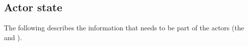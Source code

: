 
 
\subsection{Actor state}

The following describes the information that needs to be part of the \ipc actors (the \gw and \sa).


